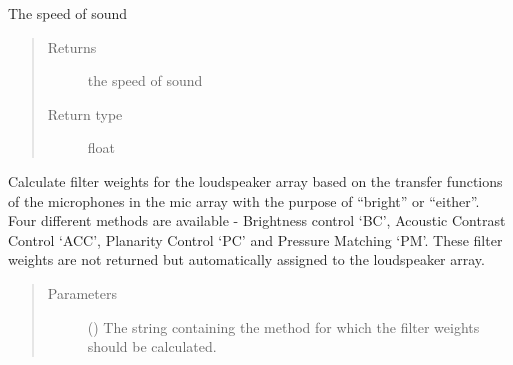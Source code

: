 \documentclass[letterpaper,10pt,english]{sphinxmanual}
\begin{document}
\begin{fulllineitems}
\begin{fulllineitems}
\end{fulllineitems}


\begin{fulllineitems}
\label{\detokenize{source/pyzones:pyzones.Simulation.c}}
The speed of sound
\begin{quote}\begin{description}
\item[{Returns}] \leavevmode
the speed of sound

\item[{Return type}] \leavevmode
float

\end{description}\end{quote}

\end{fulllineitems}


\begin{fulllineitems}
\label{\detokenize{source/pyzones:pyzones.Simulation.calculate_filter_weights}}
Calculate filter weights for the loudspeaker array based on the transfer functions of the microphones in the mic
array with the purpose of “bright” or “either”. Four different methods are available - Brightness control ‘BC’,
Acoustic Contrast Control ‘ACC’, Planarity Control ‘PC’ and Pressure Matching ‘PM’. These filter weights are not
returned but automatically assigned to the loudspeaker array.
\begin{quote}\begin{description}
\item[{Parameters}] \leavevmode
{} () \textendash{} The string containing the method for which the filter weights should be calculated.

\end{description}\end{quote}

\end{fulllineitems}



\end{fulllineitems}
\end{document}
